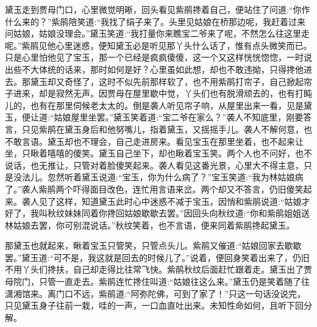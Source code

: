 \begin{parag}
    黛玉走到贾母门口，心里微觉明晰，回头看见紫鹃搀着自己，便站住了问道:“你作什么来的？”紫鹃陪笑道:“我找了绢子来了。头里见姑娘在桥那边呢，我赶着过来问姑娘，姑娘没理会。”黛玉笑道:“我打量你来瞧宝二爷来了呢，不然怎么往这里走呢。”紫鹃见他心里迷惑，便知黛玉必是听见那丫头什么话了，惟有点头微笑而已。只是心里怕他见了宝玉，那一个已经是疯疯傻傻，这一个又这样恍恍惚惚，一时说出些不大体统的话来，那时如何是好？心里虽如此想，却也不敢违拗，只得搀他进去。那黛玉却又奇怪了，这时不似先前那样软了，也不用紫鹃打帘子，自己掀起帘子进来，却是寂然无声。因贾母在屋里歇中觉，丫头们也有脱滑顽去的，也有打盹儿的，也有在那里伺候老太太的。倒是袭人听见帘子响，从屋里出来一看，见是黛玉，便让道:“姑娘屋里坐罢。”黛玉笑着道:“宝二爷在家么？”袭人不知底里，刚要答言，只见紫鹃在黛玉身后和他努嘴儿，指着黛玉，又摇摇手儿。袭人不解何意，也不敢言语。黛玉却也不理会，自己走进房来。看见宝玉在那里坐着，也不起来让坐，只瞅着嘻嘻的傻笑。黛玉自己坐下，却也瞅着宝玉笑。两个人也不问好，也不说话，也无推让，只管对着脸傻笑起来。袭人看见这番光景，心里大不得主意，只是没法儿。忽然听着黛玉说道:“宝玉，你为什么病了？”宝玉笑道:“我为林姑娘病了。”袭人紫鹃两个吓得面目改色，连忙用言语来岔。两个却又不答言，仍旧傻笑起来。袭人见了这样，知道黛玉此时心中迷惑不减于宝玉，因悄和紫鹃说道:“姑娘才好了，我叫秋纹妹妹同着你搀回姑娘歇歇去罢。”因回头向秋纹道:“你和紫鹃姐姐送林姑娘去罢，你可别混说话。”秋纹笑着，也不言语，便来同着紫鹃搀起黛玉。
\end{parag}


\begin{parag}
    那黛玉也就起来，瞅着宝玉只管笑，只管点头儿。紫鹃又催道:“姑娘回家去歇歇罢。”黛玉道:“可不是，我这就是回去的时候儿了。”说着，便回身笑着出来了，仍旧不用丫头们搀扶，自己却走得比往常飞快。紫鹃秋纹后面赶忙跟着走。黛玉出了贾母院门，只管一直走去。紫鹃连忙搀住叫道:“姑娘往这么来。”黛玉仍是笑着随了往潇湘馆来。离门口不远，紫鹃道:“阿弥陀佛，可到了家了！”只这一句话没说完，只见黛玉身子往前一栽，哇的一声，一口血直吐出来。未知性命如何，且听下回分解。
\end{parag}